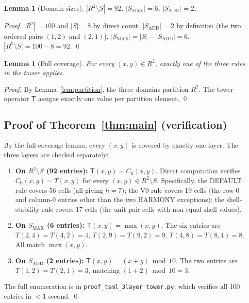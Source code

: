 \documentclass[11pt,reqno]{amsart}
\theoremstyle{plain}
\newtheorem{lemma}[theorem]{Lemma}
\theoremstyle{definition}
\begin{document}
\begin{lemma}[Domain sizes]
$|R^2 \setminus S| = 92$, $|S_{\mathrm{MAX}}| = 6$,
$|S_{\mathrm{ADD}}| = 2$.
\end{lemma}
\begin{proof}
$|R^2| = 100$ and $|S| = 8$ by direct count.
$|S_{\mathrm{ADD}}| = 2$ by definition (the two ordered pairs
$(1, 2)$ and $(2, 1)$). $|S_{\mathrm{MAX}}| = |S| -
|S_{\mathrm{ADD}}| = 6$. $|R^2 \setminus S| = 100 - 8 = 92$. \qed
\end{proof}

\begin{lemma}[Full coverage]
For every $(x, y) \in R^2$, exactly one of the three rules in the
tower applies.
\end{lemma}
\begin{proof}
By Lemma~\ref{lem:partition}, the three domains partition $R^2$.
The tower operator $\mathsf{T}$ assigns exactly one value per
partition element. \qed
\end{proof}

\subsection{Proof of Theorem~\ref{thm:main} (verification)}

By the full-coverage lemma, every $(x, y)$ is covered by exactly one
layer. The three layers are checked separately:

\begin{enumerate}
\item \textbf{On $R^2 \setminus S$ (92 entries):} $\mathsf{T}(x, y)
= C_0(x, y)$. Direct computation verifies $C_0(x, y) = T(x, y)$ for
every $(x, y) \in R^2 \setminus S$. Specifically, the DEFAULT rule
covers 56 cells (all giving $h = 7$); the V0 rule covers 19 cells
(the row-0 and column-0 entries other than the two HARMONY
exceptions); the shell-stability rule covers 17 cells (the
unit-pair cells with non-equal shell values).
\item \textbf{On $S_{\mathrm{MAX}}$ (6 entries):} $\mathsf{T}(x, y)
= \max(x, y)$. The six entries are $T(2, 4) = T(4, 2) = 4$,
$T(2, 9) = T(9, 2) = 9$, $T(4, 8) = T(8, 4) = 8$. All match
$\max(x, y)$.
\item \textbf{On $S_{\mathrm{ADD}}$ (2 entries):} $\mathsf{T}(x, y)
= (x + y) \bmod 10$. The two entries are $T(1, 2) = T(2, 1) = 3$,
matching $(1 + 2) \bmod 10 = 3$.
\end{enumerate}

The full enumeration is in \texttt{proof\_tsml\_3layer\_tower.py},
which verifies all 100 entries in $< 1$ second. \qed
\end{document}
